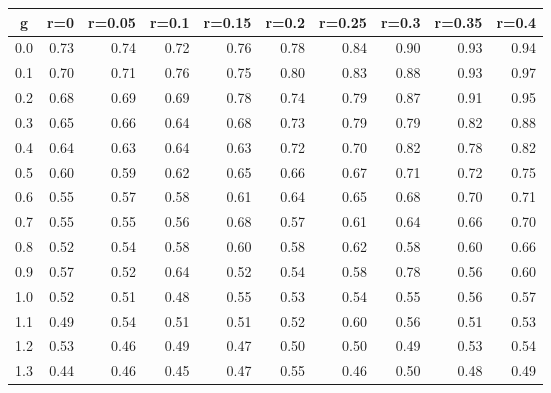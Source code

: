 %
\begin{table}[!tbp]
 \begin{center}
 \begin{tabular}{rrrrrrrrrr}\hline\hline
\multicolumn{1}{c}{g}&\multicolumn{1}{c}{r=0}&\multicolumn{1}{c}{r=0.05}&\multicolumn{1}{c}{r=0.1}&\multicolumn{1}{c}{r=0.15}&\multicolumn{1}{c}{r=0.2}&\multicolumn{1}{c}{r=0.25}&\multicolumn{1}{c}{r=0.3}&\multicolumn{1}{c}{r=0.35}&\multicolumn{1}{c}{r=0.4}\tabularnewline
\hline
0.0&0.73&0.74&0.72&0.76&0.78&0.84&0.90&0.93&0.94\tabularnewline
0.1&0.70&0.71&0.76&0.75&0.80&0.83&0.88&0.93&0.97\tabularnewline
0.2&0.68&0.69&0.69&0.78&0.74&0.79&0.87&0.91&0.95\tabularnewline
0.3&0.65&0.66&0.64&0.68&0.73&0.79&0.79&0.82&0.88\tabularnewline
0.4&0.64&0.63&0.64&0.63&0.72&0.70&0.82&0.78&0.82\tabularnewline
0.5&0.60&0.59&0.62&0.65&0.66&0.67&0.71&0.72&0.75\tabularnewline
0.6&0.55&0.57&0.58&0.61&0.64&0.65&0.68&0.70&0.71\tabularnewline
0.7&0.55&0.55&0.56&0.68&0.57&0.61&0.64&0.66&0.70\tabularnewline
0.8&0.52&0.54&0.58&0.60&0.58&0.62&0.58&0.60&0.66\tabularnewline
0.9&0.57&0.52&0.64&0.52&0.54&0.58&0.78&0.56&0.60\tabularnewline
1.0&0.52&0.51&0.48&0.55&0.53&0.54&0.55&0.56&0.57\tabularnewline
1.1&0.49&0.54&0.51&0.51&0.52&0.60&0.56&0.51&0.53\tabularnewline
1.2&0.53&0.46&0.49&0.47&0.50&0.50&0.49&0.53&0.54\tabularnewline
1.3&0.44&0.46&0.45&0.47&0.55&0.46&0.50&0.48&0.49\tabularnewline
\hline
\end{tabular}

\end{center}

\end{table}

